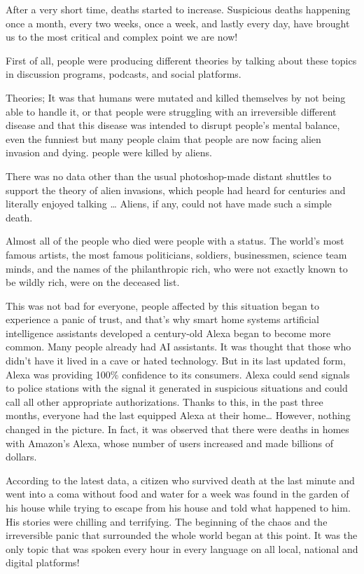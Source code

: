 \documentclass[]{book}
\begin{document}
After a very short time, deaths started to increase. Suspicious deaths happening once a month, every two weeks, once a week, and lastly every day, have brought us to the most critical and complex point we are now!

First of all, people were producing different theories by talking about these topics in discussion programs, podcasts, and social platforms.

Theories; It was that humans were mutated and killed themselves by not being able to handle it, or that people were struggling with an irreversible different disease and that this disease was intended to disrupt people's mental balance, even the funniest but many people claim that people are now facing alien invasion and dying. people were killed by aliens.

There was no data other than the usual photoshop-made distant shuttles to support the theory of alien invasions, which people had heard for centuries and literally enjoyed talking \ldots{} Aliens, if any, could not have made such a simple death.

Almost all of the people who died were people with a status. The world's most famous artists, the most famous politicians, soldiers, businessmen, science team minds, and the names of the philanthropic rich, who were not exactly known to be wildly rich, were on the deceased list.

This was not bad for everyone, people affected by this situation began to experience a panic of trust, and that's why smart home systems artificial intelligence assistants developed a century-old Alexa began to become more common. Many people already had AI assistants. It was thought that those who didn't have it lived in a cave or hated technology. But in its last updated form, Alexa was providing 100\% confidence to its consumers. Alexa could send signals to police stations with the signal it generated in suspicious situations and could call all other appropriate authorizations. Thanks to this, in the past three months, everyone had the last equipped Alexa at their home\ldots{} However, nothing changed in the picture. In fact, it was observed that there were deaths in homes with Amazon's Alexa, whose number of users increased and made billions of dollars.

According to the latest data, a citizen who survived death at the last minute and went into a coma without food and water for a week was found in the garden of his house while trying to escape from his house and told what happened to him. His stories were chilling and terrifying. The beginning of the chaos and the irreversible panic that surrounded the whole world began at this point. It was the only topic that was spoken every hour in every language on all local, national and digital platforms!
\end{document}
